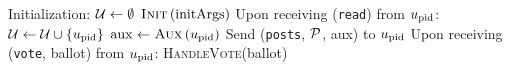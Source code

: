 \begin{algorithm}[H]
  \caption{$\gfunc\left(\textsc{Init}, \textsc{Aux},
  \textsc{HandleVote}\right)\left(\postlist, \mathrm{initArgs}\right)$}
  \label{alg:gfunc}
  \begin{algorithmic}[1]
    \State Initialization:
    \Indent
      \State $\mathcal{U} \gets \emptyset$ 
      \State $\textsc{Init}\left(\mathrm{initArgs}\right)$
    \EndIndent
    \State
    \State Upon receiving (\texttt{read}) from $u_{\mathrm{pid}}$:
    \Indent
      \State $\mathcal{U} \gets \mathcal{U} \cup \left\{u_{\mathrm{pid}}\right\}$
      \State $\mathrm{aux} \gets \textsc{Aux}\left(u_{\mathrm{pid}}\right)$
      \State Send (\texttt{posts}, $\mathcal{P}$, aux) to $u_{\mathrm{pid}}$
    \EndIndent
    \State
    \State Upon receiving (\texttt{vote}, ballot) from
    $u_{\mathrm{pid}}$:
     \Indent
       \State \textsc{HandleVote}(ballot)
     \EndIndent
  \end{algorithmic}
\end{algorithm}

